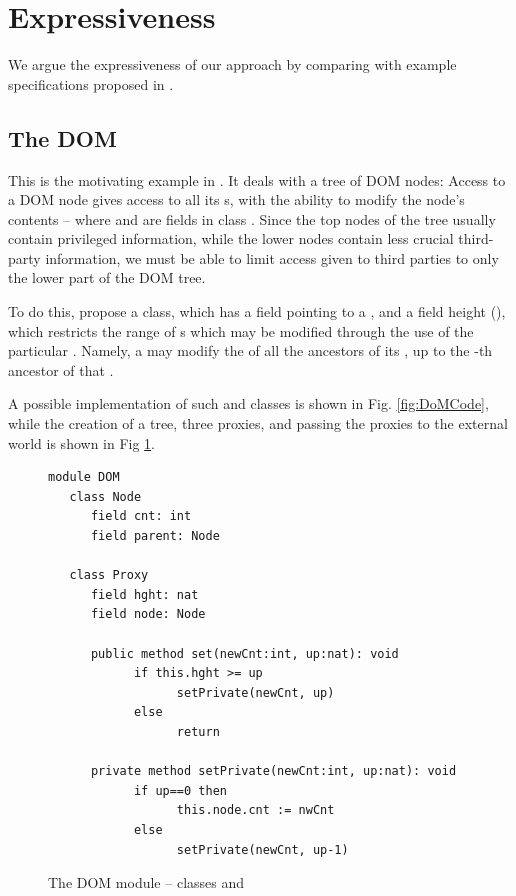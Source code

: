 \section{Expressiveness} 

\label{app:expressivity}

We argue the expressiveness of our approach by comparing with example specifications  proposed in \cite{OOPSLA22,dd,irisWasm23}.

\subsection{The DOM}  %
\label{ss:DOM}
This is the motivating example in \cite{dd}. It
deals with a tree of DOM nodes: Access to a DOM node
gives access to all its s, %
with the ability to modify the node's contents   -- where   %
and  are fields in class . Since the top nodes of the tree
usually contain privileged information, while the lower nodes contain
less crucial third-party information, we must be able to limit 
 access given to third parties to only the lower part of the DOM tree. 
 
To do this,   \citet{dd}  propose   
  a  class, which has a field  pointing to a , and a field height (), which restricts the range of s which may be modified through the use of the particular . Namely,   a   may modify 
the  of all the ancestors of its  , up to the   -th ancestor of that . 

A possible implementation of such  and  classes is shown in Fig.  \ref{fig:DoMCode}, 
while the creation of a tree, three proxies, and  passing the proxies to the external world is shown in Fig \ref{fig:DoMCodeClient}.

\begin{figure}[tbh]
\begin{lstlisting}[language = Chainmail, mathescape=true, frame=lines]
module DOM 
   class Node
      field cnt: int
      field parent: Node 
      
   class Proxy
      field hght: nat
      field node: Node
	
      public method set(newCnt:int, up:nat): void
            if this.hght >= up
                  setPrivate(newCnt, up)
            else
                  return
	       
      private method setPrivate(newCnt:int, up:nat): void
            if up==0 then
                  this.node.cnt := nwCnt
            else
                  setPrivate(newCnt, up-1)
\end{lstlisting}
\caption{The DOM module  -- classes  and }
\label{fig:DoMCodeClient}
\end{figure}


